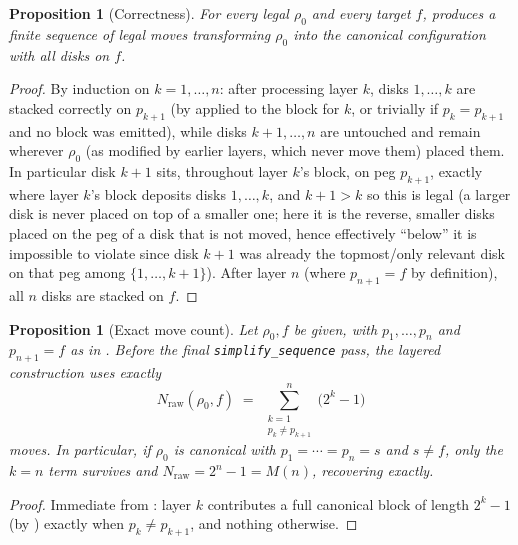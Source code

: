 \documentclass[11pt]{article}
\newtheorem{proposition}[theorem]{Proposition}
\begin{document}
\begin{proposition}[Correctness]
\label{prop:correct}
For every legal $\rho_0$ and every target $f$,  produces
a finite sequence of legal moves transforming $\rho_0$ into the canonical
configuration with all disks on $f$.
\end{proposition}

\begin{proof}
By induction on $k=1,\dots,n$: after processing layer $k$, disks
$1,\dots,k$ are stacked correctly on $p_{k+1}$ (by 
applied to the block for $k$, or trivially if $p_k=p_{k+1}$ and no block was
emitted), while disks $k+1,\dots,n$ are untouched and remain wherever
$\rho_0$ (as modified by earlier layers, which never move them) placed
them. In particular disk $k+1$ sits, throughout layer $k$'s block, on peg
$p_{k+1}$, exactly where layer $k$'s block deposits disks $1,\dots,k$, and
$k+1 > k$ so this is legal (a larger disk is never placed on top of a
smaller one; here it is the reverse, smaller disks placed on the peg of a
disk that is not moved, hence effectively ``below'' it is impossible to
violate since disk $k{+}1$ was already the topmost/only relevant disk on
that peg among $\{1,\dots,k+1\}$). After layer $n$ (where $p_{n+1}=f$ by
definition), all $n$ disks are stacked on $f$.
\end{proof}

\begin{proposition}[Exact move count]
\label{prop:count}
Let $\rho_0, f$ be given, with $p_1,\dots,p_n$ and $p_{n+1}=f$ as in
. Before the final \texttt{simplify\_sequence} pass, the
layered construction uses exactly
\begin{equation}
  \label{eq:rawcount}
  N_{\mathrm{raw}}(\rho_0,f) \;=\; \sum_{\substack{k=1 \\ p_k \ne p_{k+1}}}^{n} \big(2^k - 1\big)
\end{equation}
moves. In particular, if $\rho_0$ is canonical with $p_1 = \cdots = p_n = s$
and $s \ne f$, only the $k=n$ term survives and
$N_{\mathrm{raw}} = 2^n-1 = M(n)$, recovering  exactly.
\end{proposition}

\begin{proof}
Immediate from : layer $k$ contributes a full canonical
block of length $2^k-1$ (by ) exactly when $p_k\ne
p_{k+1}$, and nothing otherwise.
\end{proof}
\end{document}
